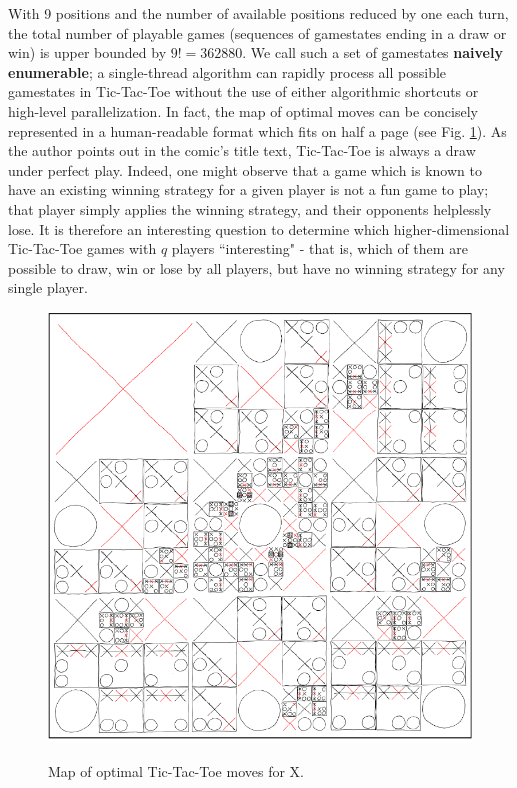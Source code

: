 \documentclass[12pt,a4paper]{article}
\begin{document}
With 9 positions and the number of available positions reduced by one each turn, the total number of playable games (sequences of gamestates ending in a draw or win) is upper bounded by $9!=362880$. We call such a set of gamestates \textbf{naively enumerable}; a single-thread algorithm can rapidly process all possible gamestates in Tic-Tac-Toe without the use of either algorithmic shortcuts or high-level parallelization. In fact, the map of optimal moves can be concisely represented in a human-readable format which fits on half a page (see Fig. \ref{fig:xkcd}). As the author points out in the comic's title text, Tic-Tac-Toe is always a draw under perfect play. Indeed, one might observe that a game which is known to have an existing winning strategy for a given player is not a fun game to play; that player simply applies the winning strategy, and their opponents helplessly lose. It is therefore an interesting question to determine which higher-dimensional Tic-Tac-Toe games with $q$ players ``interesting" - that is, which of them are possible to draw, win or lose by all players, but have no winning strategy for any single player. 
\begin{figure}[!h]
	\centering
	\includegraphics[scale=.25]{./img/xkcd_cropped.png}
	\caption{Map of optimal Tic-Tac-Toe moves for X.} \cite{munroe2010xkcd}
	\label{fig:xkcd}
\end{figure}
\end{document}
